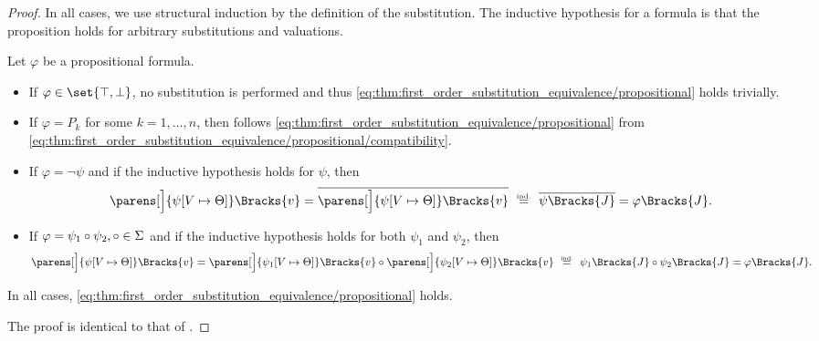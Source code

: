 \begin{proof}
  In all cases, we use structural induction by the definition of the substitution. The inductive hypothesis for a formula is that the proposition holds for arbitrary substitutions and valuations.

   Let \( \varphi \) be a propositional formula.
  \begin{itemize}
    \item If \( \varphi \in \set{ \top, \bot } \), no substitution is performed and thus \eqref{eq:thm:first_order_substitution_equivalence/propositional} holds trivially.

    \item If \( \varphi = P_k \) for some \( k = 1, \ldots, n \), then follows \eqref{eq:thm:first_order_substitution_equivalence/propositional} from \eqref{eq:thm:first_order_substitution_equivalence/propositional/compatibility}.

    \item If \( \varphi = \neg \psi \) and if the inductive hypothesis holds for \( \psi \), then
    \begin{equation*}
      \parens[\Big]{ \psi[V \mapsto \Theta] }\Bracks{v}
      =
      \overline{\parens[\Big]{ \psi[V \mapsto \Theta] }\Bracks{v}}
      \reloset {\T{ind.}} =
      \overline{\psi \Bracks{J}}
      =
      \varphi \Bracks{J}.
    \end{equation*}

    \item If \( \varphi = \psi_1 \bincirc \psi_2, \bincirc \in \Sigma \) and if the inductive hypothesis holds for both \( \psi_1 \) and \( \psi_2 \), then
    \begin{equation*}
      \parens[\Big]{ \psi[V \mapsto \Theta] }\Bracks{v}
      =
      \parens[\Big]{ \psi_1[V \mapsto \Theta] }\Bracks{v} \bincirc \parens[\Big]{ \psi_2[V \mapsto \Theta] }\Bracks{v}
      \reloset {\T{ind.}} =
      \psi_1 \Bracks{J} \bincirc \psi_2\Bracks{J}
      =
      \varphi\Bracks{J}.
    \end{equation*}
  \end{itemize}

  In all cases, \eqref{eq:thm:first_order_substitution_equivalence/propositional} holds.

   The proof is identical to that of .


\end{proof}
